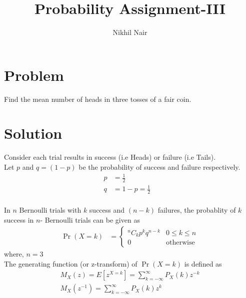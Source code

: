 \documentclass[journal,12pt,twocolumn]{IEEEtran}
\title{\mytitle}
\title{
Probability Assignment-III
}
\author{Nikhil Nair}
\providecommand{\pr}[1]{\ensuremath{\Pr\left(#1\right)}}
\begin{document}
\maketitle
\bigskip


\section{\textbf{Problem }}
Find the mean number of heads in three tosses of a fair coin.


\section{\textbf{Solution }}
Consider each trial results in success (i.e Heads) or failure (i.e Tails).
\\
 
Let $p$ and $q = (1 - p)$ be the probability of success and failure respectively.
\begin{align}
p &= \frac{1}{2}&               \label{1}
\\            
q &= 1 - p = \frac{1}{2}&       \label{2}
\end{align}
\\
In $n$ Bernoulli trials with $k$ success and $(n - k)$ failures, the probablity of $k$ success in $n$- Bernoulli trials can be given as\\
\begin{align}
\pr{X =k}  &= 
\begin{cases}
{}^nC_kp^{k}q^{n-k} & 0 \le k \le n
\\
0 & \text{otherwise}                 \label{3}
\end{cases}
\end{align}
where, $n = 3$\\

The generating function (or z-transform) of $\pr{X =k}$  is defined as 
\\
\begin{align}
&M_X(z) = E[z^{X=k}] = \sum_{k=-\infty}^{\infty} P_X(k)z^{-k}&
\\
&M_X(z^{-1})  = \sum_{k=-\infty}^{\infty} P_X(k) z^{k}&
\end{align}
\\
\end{document}
